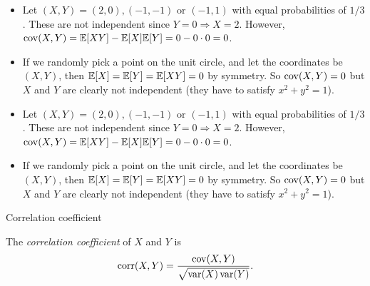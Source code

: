 \begin{note}
  \begin{field}
    \begin{eg}\leavevmode
      \begin{itemize}
        \item Let $(X, Y) = (2, 0), (-1, -1)$ or $(-1, 1)$ with equal probabilities of $1/3$. These are not independent since $Y = 0\Rightarrow X = 2$.
          However, $\operatorname{cov} (X, Y) = \mathbb{E}[XY] - \mathbb{E}[X]\mathbb{E}[Y] = 0 - 0\cdot 0 = 0$.
        \item If we randomly pick a point on the unit circle, and let the coordinates be $(X, Y)$, then $\mathbb{E}[X] = \mathbb{E}[Y] = \mathbb{E}[XY] = 0$ by symmetry. So $\operatorname{cov}(X, Y) = 0$ but $X$ and $Y$ are clearly not independent (they have to satisfy $x^2 + y^2 = 1$).
      \end{itemize}
    \end{eg}
  \end{field}
  \begin{field}
    \begin{eg}\leavevmode
      \begin{itemize}
        \item Let $(X, Y) = (2, 0), (-1, -1)$ or $(-1, 1)$ with equal probabilities of $1/3$. These are not independent since $Y = 0\Rightarrow X = 2$.
          However, $\operatorname{cov} (X, Y) = \mathbb{E}[XY] - \mathbb{E}[X]\mathbb{E}[Y] = 0 - 0\cdot 0 = 0$.
        \item If we randomly pick a point on the unit circle, and let the coordinates be $(X, Y)$, then $\mathbb{E}[X] = \mathbb{E}[Y] = \mathbb{E}[XY] = 0$ by symmetry. So $\operatorname{cov}(X, Y) = 0$ but $X$ and $Y$ are clearly not independent (they have to satisfy $x^2 + y^2 = 1$).
      \end{itemize}
    \end{eg}
  \end{field}
  \xplain{}%
\end{note}

%
\begin{note}
  \begin{field}
    Correlation coefficient
  \end{field}
  \begin{field}
    \begin{defi}
      The \emph{correlation coefficient} of $X$ and $Y$ is
      \[
        \operatorname{corr}(X, Y) = \frac{\operatorname{cov} (X, Y)}{\sqrt{\operatorname{var} (X)\operatorname{var} (Y)}}.
      \]
    \end{defi}
  \end{field}
  \xplain{}%
\end{note}

